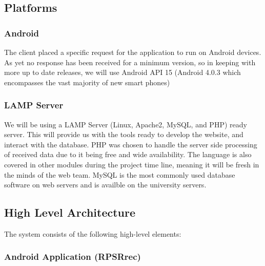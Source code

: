 \subsection{Platforms}
	\subsubsection{Android}
		The client placed a specific request for the application to run on Android devices. As yet no response has been received for a minimum version, so in keeping with more up to date releases, we will use Android API 15 (Android 4.0.3 which encompasses the vast majority of new smart phones)

	\subsubsection{LAMP Server}
		We will be using a LAMP Server (Linux, Apache2, MySQL, and PHP) ready server. This will provide us with the tools ready to develop the website, and interact with the database. PHP was chosen to handle the server side processing of received data due to it being free and wide availability. The language is also covered in other modules during the project time line, meaning it will be fresh in the minds of the web team. MySQL is the most commonly used database software on web servers and is availble on the university servers. 

\newpage
\subsection{High Level Architecture}
	The system consists of the following high-level elements:

	\subsubsection{Android Application (RPSRrec)}

